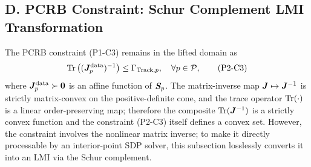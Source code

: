 \subsection*{D. PCRB Constraint: Schur Complement LMI Transformation}

The PCRB constraint (P1-C3) remains in the lifted domain as
\begin{equation}
\operatorname{Tr}\big((\bm{J}_p^{\text{data}})^{-1}\big) \leq \Gamma_{\text{Track},p}, \quad \forall p \in \mathcal{P}, \tag{P2-C3}
\end{equation}
where $\bm{J}_p^{\text{data}} \succ \bm{0}$ is an affine function of $\bm{S}_p$. The matrix-inverse map $\bm{J} \mapsto \bm{J}^{-1}$ is strictly matrix-convex on the positive-definite cone, and the trace operator $\operatorname{Tr}(\cdot)$ is a linear order-preserving map; therefore the composite $\operatorname{Tr}(\bm{J}^{-1})$ is a strictly convex function and the constraint (P2-C3) itself defines a convex set. However, the constraint involves the nonlinear matrix inverse; to make it directly processable by an interior-point SDP solver, this subsection losslessly converts it into an LMI via the Schur complement.

